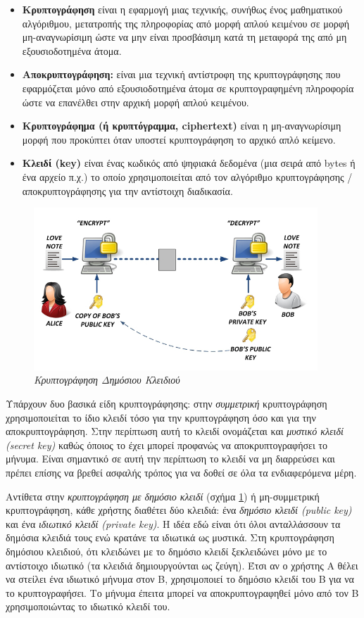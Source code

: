 \begin{itemize}
\item \textbf{Κρυπτογράφηση} είναι η εφαρμογή μιας τεχνικής, συνήθως ένος μαθηματικού αλγόριθμου, μετατροπής της πληροφορίας από μορφή απλού κειμένου σε μορφή μη-αναγνωρίσιμη ώστε να μην είναι προσβάσιμη κατά τη μεταφορά της από μη εξουσιοδοτημένα άτομα.
\item \textbf{Αποκρυπτογράφηση:} είναι μια τεχνική αντίστροφη της κρυπτογράφησης που εφαρμόζεται μόνο από εξουσιοδοτημένα άτομα σε κρυπτογραφημένη πληροφορία ώστε να επανέλθει στην αρχική μορφή απλού κειμένου.
\item \textbf{Κρυπτογράφημα (ή κρυπτόγραμμα, ciphertext)} είναι η μη-αναγνωρίσιμη μορφή που προκύπτει όταν υποστεί κρυπτογράφηση το αρχικό απλό κείμενο.
\item \textbf{Κλειδί (key)} είναι ένας κωδικός από ψηφιακά δεδομένα (μια σειρά από bytes ή ένα αρχείο π.χ.) το οποίο χρησιμοποιείται από τον αλγόριθμο κρυπτογράφησης / αποκρυπτογράφησης για την αντίστοιχη διαδικασία. 
\end{itemize}

\begin{figure}[!ht]
 \centering
 \includegraphics[width=0.95\textwidth]{images/chapter8/8-2}
 \caption {\textsl{Κρυπτογράφηση Δημόσιου Κλειδιού}}
 \label{8-2}
\end{figure}

Υπάρχουν δυο βασικά είδη κρυπτογράφησης: στην \emph{συμμετρική} κρυπτογράφηση χρησιμοποιείται το ίδιο κλειδί τόσο για την κρυπτογράφηση όσο και για την αποκρυπτογράφηση. Στην περίπτωση αυτή το κλειδί ονομάζεται και \emph{μυστικό κλειδί (secret key)} καθώς όποιος το έχει μπορεί προφανώς να αποκρυπτογραφήσει το μήνυμα. Είναι σημαντικό σε αυτή την περίπτωση το κλειδί να μη διαρρεύσει και πρέπει επίσης να βρεθεί ασφαλής τρόπος για να δοθεί σε όλα τα ενδιαφερόμενα μέρη. 

Αντίθετα στην \emph{κρυπτογράφηση με δημόσιο κλειδί} (σχήμα \ref{8-2}) ή μη-συμμετρική κρυπτογράφηση, κάθε χρήστης διαθέτει δύο κλειδιά: ένα \emph{δημόσιο κλειδί (public key)} και ένα \emph{ιδιωτικό κλειδί (private key)}. Η ιδέα εδώ είναι ότι όλοι ανταλλάσσουν τα δημόσια κλειδιά τους ενώ κρατάνε τα ιδιωτικά ως μυστικά. Στη κρυπτογράφηση δημόσιου κλειδιού, ότι κλειδώνει με το δημόσιο κλειδί ξεκλειδώνει μόνο με το αντίστοιχο ιδιωτικό (τα κλειδιά δημιουργούνται ως ζεύγη). Έτσι αν ο χρήστης Α θέλει να στείλει ένα ιδιωτικό μήνυμα στον Β, χρησιμοποιεί το δημόσιο κλειδί του Β για να το κρυπτογραφήσει. Το μήνυμα έπειτα μπορεί να αποκρυπτογραφηθεί μόνο από τον Β χρησιμοποιώντας το ιδιωτικό κλειδί του.
